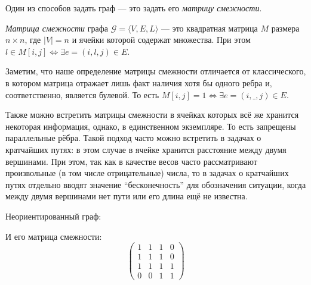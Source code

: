 Один из способов задать граф --- это задать его \textit{матрицу смежности}.

\begin{definition}
  \textit{Матрица смежности} графа $\mathcal{G}=\langle V,E,L \rangle$ --- это квадратная матрица $M$ размера $n \times n$, где $|V| = n$ и ячейки которой содержат множества.
  При этом $l \in M[i,j] \iff \exists e = (i,l,j) \in E$.
\end{definition}

Заметим, что наше определение матрицы смежности отличается от классического, в котором матрица отражает лишь факт наличия хотя бы одного ребра и, соответственно, является булевой. То есть $M[i,j] = 1 \iff \exists e = (i,\_,j) \in E$.


Также можно встретить матрицы смежности в ячейках которых всё же хранится некоторая информация, однако, в единственном экземпляре. То есть запрещены параллельные рёбра.
Такой подход часто можно встретить в задачах о кратчайших путях: в этом случае в ячейке хранится расстояние между двумя вершинами.
При этом, так как в качестве весов часто рассматривают произвольные (в том числе отрицательные) числа, то в задачах о кратчайших путях отдельно вводят значение ``бесконечность'' для обозначения ситуации, когда между двумя вершинами нет пути или его длина ещё не известна.


\begin{example}
  Неориентированный граф:
  \begin{center}
  \end{center}

  И его матрица смежности:
  $$
  \begin{pmatrix}
    1 & 1 & 1 & 0 \\
    1 & 1 & 1 & 0 \\
    1 & 1 & 1 & 1 \\
    0 & 0 & 1 & 1
  \end{pmatrix}
  $$
\end{example}

